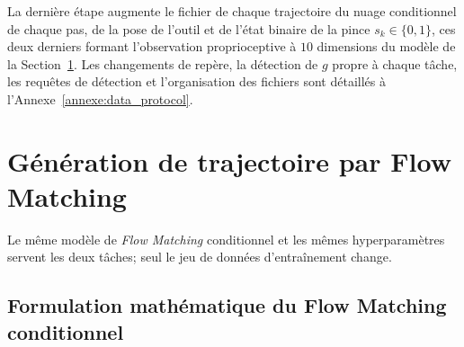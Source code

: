La dernière étape augmente le fichier de chaque trajectoire du nuage conditionnel de chaque pas, de la pose de l'outil et de l'état binaire de la pince $s_k\in\{0,1\}$, ces deux derniers formant l'observation proprioceptive à $10$ dimensions du modèle de la Section~\ref{sec:CFM}. Les changements de repère, la détection de $g$ propre à chaque tâche, les requêtes de détection et l'organisation des fichiers sont détaillés à l'Annexe~\ref{annexe:data_protocol}.

\section{Génération de trajectoire par Flow Matching} \label{sec:CFM}
Le même modèle de \textit{Flow Matching} conditionnel et les mêmes hyperparamètres servent les deux tâches; seul le jeu de données d'entraînement change.

\subsection{Formulation mathématique du Flow Matching conditionnel}

